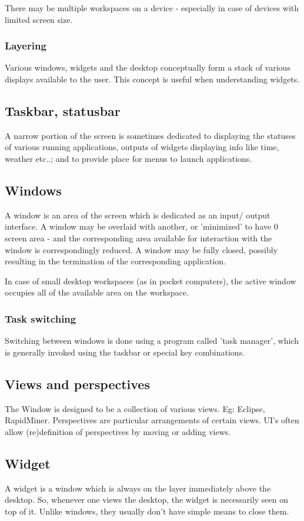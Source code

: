 \documentclass[oneside, article]{memoir}
\begin{document}
There may be multiple workspaces on a device - especially in case of devices with limited screen size.

\subsubsection{Layering}
Various windows, widgets and the desktop conceptually form a stack of various displays available to the user. This concept is useful when understanding widgets.

\subsection{Taskbar, statusbar}
A narrow portion of the screen is sometimes dedicated to displaying the statuses of various running applications, outputs of widgets displaying info like time, weather etc..; and to provide place for menus to launch applications.

\subsection{Windows}
A window is an area of the screen which is dedicated as an input/ output interface. A window may be overlaid with another, or 'minimized' to have 0 screen area - and the corresponding area available for interaction with the window is correspondingly reduced. A window may be fully closed, possibly resulting in the termination of the corresponding application.

In case of small desktop workspaces (as in pocket computers), the active window occupies all of the available area on the workspace.

\subsubsection{Task switching}
Switching between windows is done using a program called 'task manager', which is generally invoked using the taskbar or special key combinations.

\subsection{Views and perspectives}
The Window is designed to be a collection of various views. Eg: Eclipse, RapidMiner. Perspectives are particular arrangements of certain views. UI's often allow (re)definition of perspectives by moving or adding views.

\subsection{Widget}
A widget is a window which is always on the layer  immediately above the desktop. So, whenever one views the desktop, the widget is necessarily seen on top of it. Unlike windows, they usually don't have simple means to close them.
\end{document}

